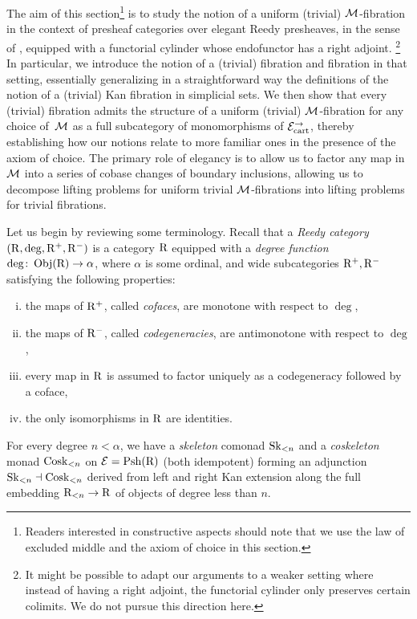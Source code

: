 \documentclass[reqno,10pt,a4paper,oneside,draft]{amsart}
\begin{document}
The aim of this section\footnote{Readers interested in constructive aspects should note that we
use the law of excluded middle and the axiom of choice in this section.} is to study the notion of a uniform (trivial) $\cal{M}$-fibration in the context of presheaf categories over elegant Reedy presheaves, in the sense of \cite{bergner-rezk-elegant}, equipped with a functorial cylinder whose endofunctor has a right adjoint.%
\footnote{It might be possible to adapt our arguments to a weaker setting where instead of having a right adjoint, the functorial cylinder only preserves certain colimits. We do not pursue this direction here.}
In particular, we introduce the notion of a (trivial) fibration and fibration in that setting, essentially generalizing in a straightforward way the definitions of the notion of a (trivial) Kan fibration in simplicial sets.
We then show that every (trivial) fibration admits the structure of a uniform (trivial) $\cal{M}$-fibration for any choice of~$\cal{M}$ as a full subcategory of monomorphisms of $\cal{E}_{\cart}^\to$, thereby establishing how our notions relate to more familiar ones in the presence of the axiom of choice.
The primary role of elegancy is to allow us to factor any map in $\cal{M}$ into a series of cobase changes of boundary inclusions, allowing us to decompose lifting problems for uniform trivial $\cal{M}$-fibrations into lifting problems for trivial fibrations.

Let us begin by reviewing some terminology.
Recall that a \emph{Reedy category} $(\R, \deg, \Rp, \Rm)$ is a category $\R$ equipped with a \emph{degree function} $\deg \co \obj(\R) \to \alpha$, where $\alpha$ is some ordinal, and wide subcategories $\Rp, \Rm$ satisfying the following properties:
\begin{enumerate}[(i)]
\item the maps of $\Rp$, called \emph{cofaces}, are monotone with respect to $\deg$,
\item the maps of $\Rm$, called \emph{codegeneracies}, are antimonotone with respect to $\deg$,
\item every map in $\R$ is assumed to factor uniquely as a codegeneracy followed by a coface,
\item the only isomorphisms in $\R$ are identities.
\end{enumerate}
For every degree $n < \alpha$, we have a \emph{skeleton} comonad $\Sk_{<n}$ and a \emph{coskeleton} monad $\Cosk_{<n}$ on $\catE = \Psh(\R)$ (both idempotent) forming an adjunction $\Sk_{<n} \dashv \Cosk_{<n}$ derived from left and right Kan extension along the full embedding $\R_{<n} \to \R$ of objects of degree less than $n$.
\end{document}
